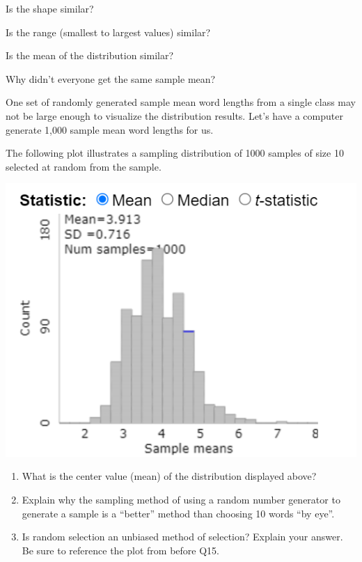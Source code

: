 \documentclass[
]{report}
\newcommand{\rgi}{\hspace{24pt}}  %
\begin{document}
\rgi Is the shape similar?\\
\vspace{0.2in}

\rgi Is the range (smallest to largest values) similar?

\vspace{0.2in}

\rgi Is the mean of the distribution similar?

\vspace{0.2in}

\rgi Why didn't everyone get the same sample mean?
\vspace{0.4in}

\newpage

One set of randomly generated sample mean word lengths from a single class may not be large enough to visualize the distribution results. Let's have a computer generate 1,000 sample mean word lengths for us.

The following plot illustrates a sampling distribution of 1000 samples of size 10 selected at random from the sample.

\begin{center}\includegraphics[width=0.75\linewidth]{images/bencenti_sampling10} \end{center}

\begin{enumerate}
\def\labelenumi{\arabic{enumi}.}
\setcounter{enumi}{14}
\item
  What is the center value (mean) of the distribution displayed above?
  \vspace{0.3in}
\item
  Explain why the sampling method of using a random number generator to generate a sample is a ``better'' method than choosing 10 words ``by eye''.
  \vspace{0.8in}
\item
  Is random selection an unbiased method of selection? Explain your answer. Be sure to reference the plot from before Q15.
  \vspace{0.5in}
\end{enumerate}
\end{document}
